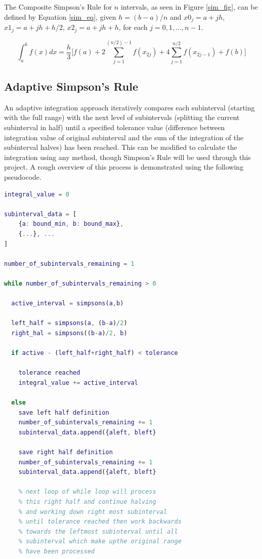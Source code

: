 \documentclass[a4paper]{article}
\begin{document}
The Composite Simpson's Rule for $n$ intervals, as seen in Figure \ref{sim_fig}, can be defined by Equation \ref{sim_eq}, given $h=(b-a)/n$ and $x0_j=a+jh$, $x1_j=a+jh+h/2$, $x2_j=a+jh+h$,  for each $j=0,1,\dots,n-1$.
     
\begin{equation}
\int_{a}^b f(x) dx = \frac{h}{3}\Bigg[ f(a) + 2\sum_{j=1}^{(n/2)-1} f(x_{2j}) + 4\sum_{j=1}^{n/2} f(x_{2j-1}) + f(b) \Bigg]
\label{sim_eq}
\end{equation}



\subsection{Adaptive Simpson's Rule}
\label{method:adaptive}

An adaptive integration approach iteratively compares each subinterval (starting with the full range) with the next level of subintervals (splitting the current subinterval in half) until a specified tolerance value (difference between integration value of original subinterval and the sum of the integration of the subinterval halves) has been reached. This can be modified to calculate the integration using any method, though Simpson's Rule will be used through this project. A rough overview of this process is demonstrated using the following pseudocode.

\bigskip
\begin{lstlisting}[language=Matlab]
integral_value = 0

subinterval_data = [
    {a: bound_min, b: bound_max}, 
    {...}, ...
]

number_of_subintervals_remaining = 1

while number_of_subintervals_remaining > 0

  active_interval = simpsons(a,b)
	
  left_half = simpsons(a, (b-a)/2)
  right_hal = simpsons((b-a)/2, b)
	
  if active - (left_half+right_half) < tolerance
		
  	tolerance reached
	integral_value += active_interval
		
  else
	save left half definition
	number_of_subintervals_remaining += 1
	subinterval_data.append({aleft, bleft}

	save right half definition		
	number_of_subintervals_remaining += 1
	subinterval_data.append({aleft, bleft}
		
	% next loop of while loop will process 
	% this right half and continue halving 
	% and working down right most subinterval 
	% until tolerance reached then work backwards
	% towards the leftmost subinterval until all 
	% subinterval which make upthe original range 
	% have been processed		

\end{lstlisting}
\bigskip
\end{document}
